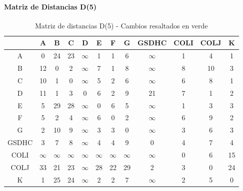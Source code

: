 \documentclass[12pt]{article}
\begin{document}
\paragraph{Matriz de Distancias D(5)}
\begin{table}[h!]
\centering
\begin{tabular}{|c|c|c|c|c|c|c|c|c|c|c|c|}
\hline
 & A & B & C & D & E & F & G & GSDHC & COLI & COLJ & K \\\hline
A & 0 & 24 & 23 & $\infty$ & 1 & 1 & \cellcolor{lightgreen} 6 & $\infty$ & 1 & \cellcolor{lightgreen} 4 & 1 \\\hline
B & 12 & 0 & 2 & $\infty$ & 7 & 1 & 8 & $\infty$ & \cellcolor{lightgreen} 8 & \cellcolor{lightgreen} 10 & 3 \\\hline
C & \cellcolor{lightgreen} 10 & 1 & 0 & $\infty$ & 5 & 2 & 6 & $\infty$ & \cellcolor{lightgreen} 6 & \cellcolor{lightgreen} 8 & 1 \\\hline
D & \cellcolor{lightgreen} 11 & 1 & 3 & 0 & 6 & 2 & 9 & 21 & \cellcolor{lightgreen} 7 & 1 & 2 \\\hline
E & 5 & 29 & 28 & $\infty$ & 0 & 6 & 5 & $\infty$ & 1 & 3 & 3 \\\hline
F & 5 & 2 & 4 & $\infty$ & 6 & 0 & 2 & $\infty$ & 6 & \cellcolor{lightgreen} 9 & 2 \\\hline
G & 2 & 10 & 9 & $\infty$ & 3 & 3 & 0 & $\infty$ & 3 & \cellcolor{lightgreen} 6 & 3 \\\hline
GSDHC & 3 & 7 & 8 & $\infty$ & 4 & 4 & \cellcolor{lightgreen} 9 & 0 & 4 & 7 & 4 \\\hline
COLI & $\infty$ & $\infty$ & $\infty$ & $\infty$ & $\infty$ & $\infty$ & $\infty$ & $\infty$ & 0 & 6 & 15 \\\hline
COLJ & 33 & 21 & 23 & $\infty$ & 28 & 22 & 29 & 2 & 3 & 0 & 24 \\\hline
K & 1 & 25 & 24 & $\infty$ & 2 & 2 & \cellcolor{lightgreen} 7 & $\infty$ & 2 & 5 & 0 \\\hline
\end{tabular}
\caption{Matriz de distancias D(5) - Cambios resaltados en verde}
\end{table}
\end{document}
